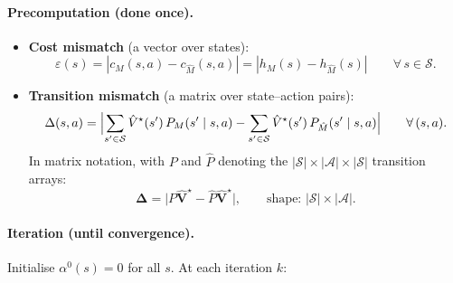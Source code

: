 \documentclass[11pt]{article}
\newcommand{\Vhatstar}{\hat V^\star}
\begin{document}
\paragraph{Precomputation (done once).}
\begin{itemize}
  \item \textbf{Cost mismatch} (a vector over states):
  \begin{equation}\label{eq:eps-q}
    \varepsilon(s) = |c_M(s,a) - c_{\hat M}(s,a)| = |h_M(s) - h_{\hat M}(s)|
    \qquad \forall\, s \in \mathcal{S}.
  \end{equation}

  \item \textbf{Transition mismatch} (a matrix over state--action pairs):
  \begin{equation}\label{eq:delta-q}
    \Delta(s, a) = \Bigl|
      \sum_{s' \in \mathcal{S}} \Vhatstar(s')\, P_M(s' \mid s, a)
      - \sum_{s' \in \mathcal{S}} \Vhatstar(s')\, P_{\hat M}(s' \mid s, a)
    \Bigr|
    \qquad \forall\, (s, a).
  \end{equation}
  In matrix notation, with $P$ and $\hat P$ denoting the $|\mathcal{S}| \times
  |\mathcal{A}| \times |\mathcal{S}|$ transition arrays:
  \[
    \boldsymbol{\Delta} = \bigl| P \hat{\mathbf{V}}^\star
    - \hat P \hat{\mathbf{V}}^\star \bigr|,
    \qquad \text{shape: } |\mathcal{S}| \times |\mathcal{A}|.
  \]
\end{itemize}

\paragraph{Iteration (until convergence).}
Initialise $\alpha^0(s) = 0$ for all $s$.  At each iteration $k$:
\end{document}
